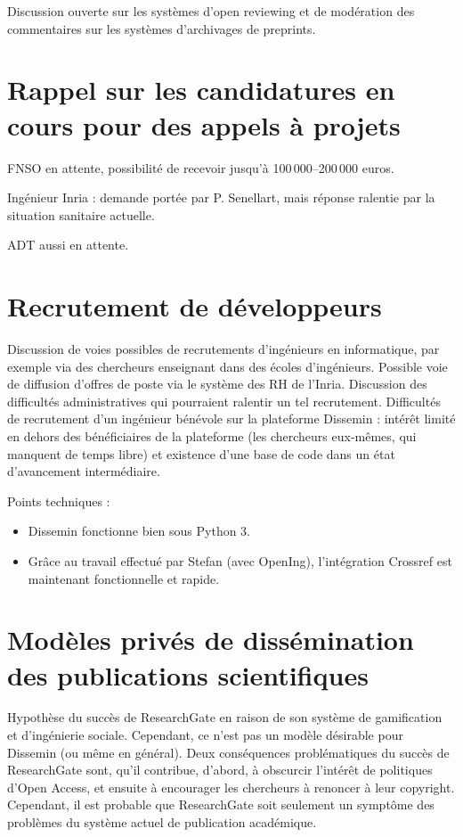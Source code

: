 \documentclass[a4paper]{article}
\begin{document}
Discussion ouverte sur les systèmes d'open reviewing et de modération des commentaires sur les systèmes d'archivages de preprints. 

\section{Rappel sur les candidatures en cours pour des appels à projets}
FNSO en attente, possibilité de recevoir jusqu'à 100\,000--200\,000 euros. 

Ingénieur Inria : demande portée par P. Senellart, mais réponse ralentie par la situation sanitaire actuelle.

ADT aussi en attente. 

\section{Recrutement de développeurs}
Discussion de voies possibles de recrutements d'ingénieurs en informatique, par exemple via des chercheurs enseignant dans des écoles d'ingénieurs. Possible voie de diffusion d'offres de poste via le système des RH de l'Inria. Discussion des difficultés administratives qui pourraient ralentir un tel recrutement. Difficultés de recrutement d'un ingénieur bénévole sur la plateforme Dissemin : intérêt limité en dehors des bénéficiaires de la plateforme (les chercheurs eux-mêmes, qui manquent de temps libre) et existence d'une base de code dans un état d'avancement intermédiaire.


Points techniques : \begin{itemize}
\item Dissemin fonctionne bien sous Python 3. 
\item Grâce au travail effectué par Stefan (avec OpenIng), l'intégration Crossref est maintenant fonctionnelle et rapide. 
\end{itemize}

\section{Modèles privés de dissémination des publications scientifiques}

Hypothèse du succès de ResearchGate en raison de son système de gamification et d'ingénierie sociale. Cependant, ce n'est pas un modèle désirable pour Dissemin (ou même en général). Deux conséquences problématiques du succès de ResearchGate sont, qu'il contribue, d'abord, à obscurcir l'intérêt de politiques d'Open Access, et ensuite à encourager les chercheurs à renoncer à leur copyright. Cependant, il est probable que ResearchGate soit seulement un symptôme des problèmes du système actuel de publication académique.
\end{document}
